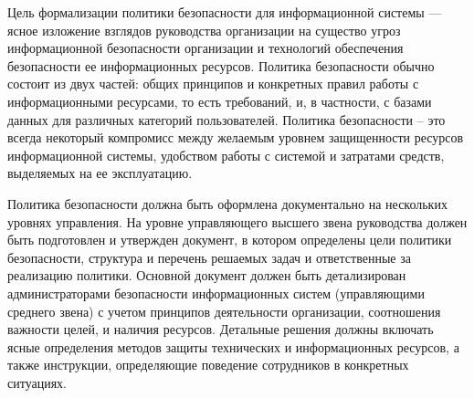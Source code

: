 Цель формализации политики безопасности для информационной системы — ясное изложение взглядов руководства
организации на существо угроз информационной безопасности организации и технологий обеспечения безопасности ее
информационных ресурсов. Политика безопасности обычно состоит из двух частей: общих принципов и конкретных правил
работы с информационными ресурсами, то есть требований, и, в частности, с базами данных для различных категорий
пользователей. Политика безопасности – это всегда некоторый компромисс между желаемым уровнем защищенности ресурсов
информационной системы, удобством работы с системой и затратами средств, выделяемых на ее эксплуатацию.

Политика безопасности должна быть оформлена документально на нескольких уровнях управления. На уровне управляющего
высшего звена руководства должен быть подготовлен и утвержден документ, в котором определены цели политики
безопасности, структура и перечень решаемых задач и ответственные за реализацию политики. Основной документ
должен быть детализирован администраторами безопасности информационных систем (управляющими среднего звена)
с учетом принципов деятельности организации, соотношения важности целей, и наличия ресурсов. Детальные решения
должны включать ясные определения методов защиты технических и информационных ресурсов, а также инструкции,
определяющие поведение сотрудников в конкретных ситуациях.

